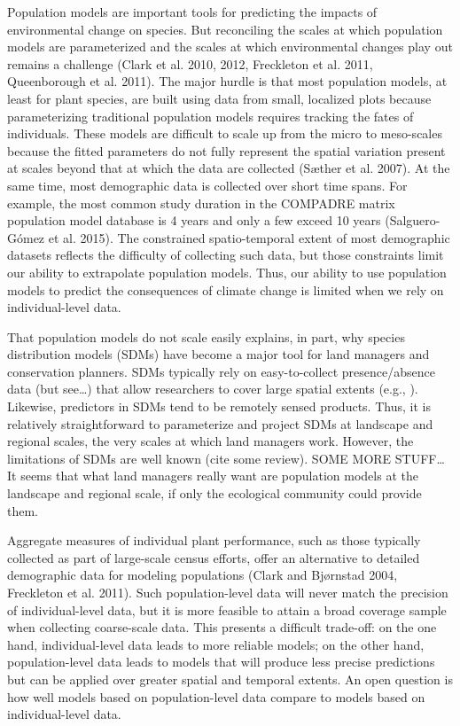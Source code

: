 \documentclass[12pt,]{article}
\begin{document}
Population models are important tools for predicting the impacts of
environmental change on species. But reconciling the scales at which
population models are parameterized and the scales at which
environmental changes play out remains a challenge (Clark et al. 2010,
2012, Freckleton et al. 2011, Queenborough et al. 2011). The major
hurdle is that most population models, at least for plant species, are
built using data from small, localized plots because parameterizing
traditional population models requires tracking the fates of
individuals. These models are difficult to scale up from the micro to
meso-scales because the fitted parameters do not fully represent the
spatial variation present at scales beyond that at which the data are
collected (Sæther et al. 2007). At the same time, most demographic data
is collected over short time spans. For example, the most common study
duration in the COMPADRE matrix population model database is 4 years and
only a few exceed 10 years (Salguero-Gómez et al. 2015). The constrained
spatio-temporal extent of most demographic datasets reflects the
difficulty of collecting such data, but those constraints limit our
ability to extrapolate population models. Thus, our ability to use
population models to predict the consequences of climate change is
limited when we rely on individual-level data.

That population models do not scale easily explains, in part, why
species distribution models (SDMs) have become a major tool for land
managers and conservation planners. SDMs typically rely on
easy-to-collect presence/absence data (but see\ldots{}) that allow
researchers to cover large spatial extents (e.g., ). Likewise,
predictors in SDMs tend to be remotely sensed products. Thus, it is
relatively straightforward to parameterize and project SDMs at landscape
and regional scales, the very scales at which land managers work.
However, the limitations of SDMs are well known (cite some review). SOME
MORE STUFF\ldots{} It seems that what land managers really want are
population models at the landscape and regional scale, if only the
ecological community could provide them.

Aggregate measures of individual plant performance, such as those
typically collected as part of large-scale census efforts, offer an
alternative to detailed demographic data for modeling populations (Clark
and Bjørnstad 2004, Freckleton et al. 2011). Such population-level data
will never match the precision of individual-level data, but it is more
feasible to attain a broad coverage sample when collecting coarse-scale
data. This presents a difficult trade-off: on the one hand,
individual-level data leads to more reliable models; on the other hand,
population-level data leads to models that will produce less precise
predictions but can be applied over greater spatial and temporal
extents. An open question is how well models based on population-level
data compare to models based on individual-level data.
\end{document}
